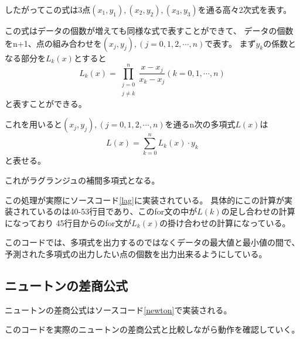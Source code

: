 \documentclass[a4paper,11pt,dvipdfmx]{jsarticle}
\begin{document}
したがってこの式は3点$(x_1,y_1),(x_2,y_2),(x_3,y_3)$を通る高々2次式を表す。

この式はデータの個数が増えても同様な式で表すことができて、
データの個数をn+1、点の組み合わせを$(x_j,y_j),(j=0,1,2,\cdots,n)$で表す。
まず$y_k$の係数となる部分を$L_k(x)$とすると
\begin{equation*}
    L_k(x) = \prod_{\substack{j=0 \\ j \neq k}}^{n} \frac{x-x_j}{x_k-x_j} (k=0,1,\cdots,n)
\end{equation*}
と表すことができる。

これを用いると$(x_j,y_j),(j=0,1,2,\cdots,n)$を通るn次の多項式$L(x)$は
\begin{equation*}
    L(x) = \sum_{k=0}^{n} L_k(x) \cdot y_k
\end{equation*}
と表せる。

これがラグランジュの補間多項式となる。

この処理が実際にソースコード\ref{lag}に実装されている。
具体的にこの計算が実装されているのは40-53行目であり、このfor文の中が$L(k)$の足し合わせの計算になっており
45行目からのfor文が$L_k(x)$の掛け合わせの計算になっている。

このコードでは、多項式を出力するのではなくデータの最大値と最小値の間で、
予測された多項式の出力したい点の個数を出力出来るようにしている。

\subsection{ニュートンの差商公式}
ニュートンの差商公式はソースコード\ref{newton}で実装される。


このコードを実際のニュートンの差商公式と比較しながら動作を確認していく。
\end{document}
